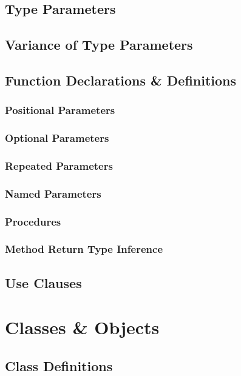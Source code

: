 \section{Type Parameters}

\section{Variance of Type Parameters}

\section{Function Declarations \& Definitions}

\subsection{Positional Parameters}

\subsection{Optional Parameters}

\subsection{Repeated Parameters}

\subsection{Named Parameters}

\subsection{Procedures}

\subsection{Method Return Type Inference}

\section{Use Clauses}

\chapter{Classes \& Objects}

\section{Class Definitions}

